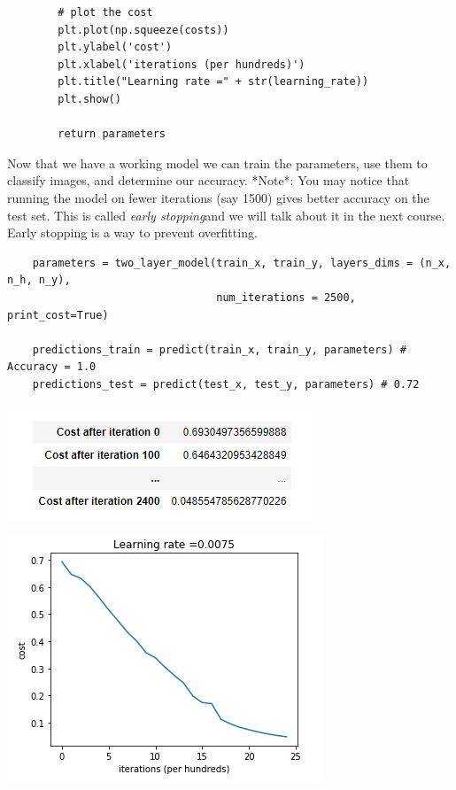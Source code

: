 \documentclass[11pt, a4paper]{article}
\begin{document}
\begin{spacing}{1.1}
\begin{lstlisting}
		# plot the cost
		plt.plot(np.squeeze(costs))
		plt.ylabel('cost')
		plt.xlabel('iterations (per hundreds)')
		plt.title("Learning rate =" + str(learning_rate))
		plt.show()
		
		return parameters \end{lstlisting} \vspace*{1mm}
	Now that we have a working model we can train the parameters, use them to classify images, and determine our accuracy. *Note*: You may notice that running the model on fewer iterations (say 1500) gives better accuracy on the test set. This is called \textit{early stopping}and we will talk about it in the next course. Early stopping is a way to prevent overfitting. 
	\begin{lstlisting}
	parameters = two_layer_model(train_x, train_y, layers_dims = (n_x, n_h, n_y), 
	                             num_iterations = 2500, print_cost=True)
	
	predictions_train = predict(train_x, train_y, parameters) # Accuracy = 1.0
	predictions_test = predict(test_x, test_y, parameters) # 0.72	\end{lstlisting} \vspace*{1mm}
	\begin{minipage}[c]{8.3cm}
	\hspace*{6mm} \includegraphics[scale=.9]{cost_cat_2}
	\end{minipage}
	\begin{minipage}[c]{9cm}
	\hspace*{17mm} \includegraphics[scale=.6]{lr_graph_2}
	\end{minipage} \newpage


\end{spacing}
\end{document}
